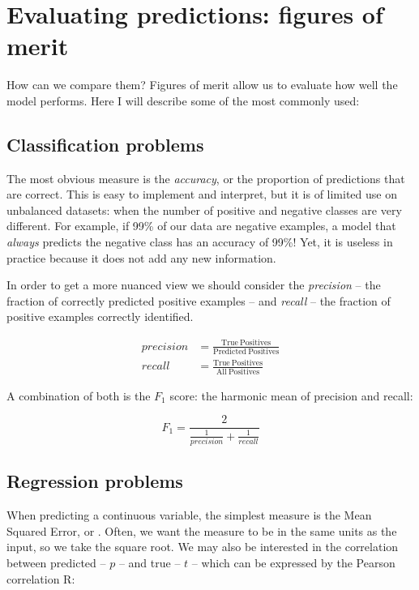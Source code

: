 \section{Evaluating predictions: figures of merit}
How can we compare them?
Figures of merit allow us to evaluate how well the model performs.
Here I will describe some of the most commonly used:

\subsection{Classification problems}
The most obvious measure is the \emph{accuracy}, or the proportion of predictions that are correct.
This is easy to implement and interpret, but it is of limited use on unbalanced datasets: when the number of positive and negative classes are very different.
For example, if 99\% of our data are negative examples, a model that \emph{always} predicts the negative class has an accuracy of 99\%!
Yet, it is useless in practice because it does not add any new information.

In order to get  a more nuanced view we should consider the \emph{precision} -- the fraction of correctly predicted positive examples -- 
and \emph{recall} -- the fraction of positive examples correctly identified.

\begin{align*}
precision &= \frac{\mathrm{True\ Positives}}{\mathrm{Predicted\ Positives}}\\
recall &= \frac{\mathrm{True\ Positives}}{\mathrm{All\ Positives}}
\end{align*}

A combination  of both is the $F_1$ score: the harmonic mean of precision and recall:

\begin{equation*}
F_1 = \frac{2}{\frac{1}{precision} + \frac{1}{recall}}
\end{equation*}

\subsection{Regression problems}
When predicting a continuous variable, the simplest measure is the Mean Squared Error, or \MSE.
Often, we want the measure to be in the same units as the input, so we take the square root.
We may also be interested in the correlation between predicted -- $p$ -- and true -- $t$ -- which can be expressed by the Pearson correlation R:

